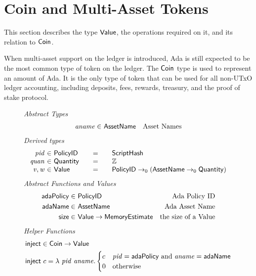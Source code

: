 \section{Coin and Multi-Asset Tokens}
\label{sec:coin-ma}

This section describes the type $\mathsf{Value}$, the operations required on
it, and its relation to $\mathsf{Coin}$.

When multi-asset support on the ledger is introduced, Ada is still expected to be
the most common type of token on the ledger.
The $\mathsf{Coin}$ type is used to represent an amount of Ada.
It is the only
type of token that can be used for all non-UTxO ledger accounting, including deposits,
fees, rewards, treasury, and the proof of stake protocol.

\begin{figure*}[t!]
  \emph{Abstract Types}
  \begin{align*}
    \mathit{aname} \in& ~\mathsf{AssetName} & \text{Asset Names}
  \end{align*}
  \emph{Derived types}
  \begin{equation*}
    \begin{array}{r@{~\in~}l@{\qquad=\qquad}lr}
      \var{pid} & \PolicyID & \ScriptHash \\
      \var{quan} & \Quantity & \Z \\
      \var{v}, \var{w} & \Value
      & \PolicyID \to_0 ( \AssetName \to_0 \Quantity )
    \end{array}
  \end{equation*}
  \emph{Abstract Functions and Values}
  \begin{align*}
    \mathsf{adaPolicy} \in& ~\mathsf{PolicyID} & \text{Ada Policy ID} \\
    \mathsf{adaName} \in& ~\mathsf{AssetName} & \text{Ada Asset Name} \\
    \mathsf{size} \in& ~\mathsf{Value}\to\mathsf{MemoryEstimate} & \text{the size of a Value}
  \end{align*}
  \emph{Helper Functions}
  \begin{align*}
    & \fun{inject} \in \Coin\to \Value \\
    & \fun{inject}~c = \lambda~\var{pid}~\var{aname}.
      \begin{cases}
        c & \var{pid} = \mathsf{adaPolicy}~\text{and}~\var{aname} = \mathsf{adaName} \\
        0 & \text{otherwise}
      \end{cases}

\end{align*}
\end{figure*}
